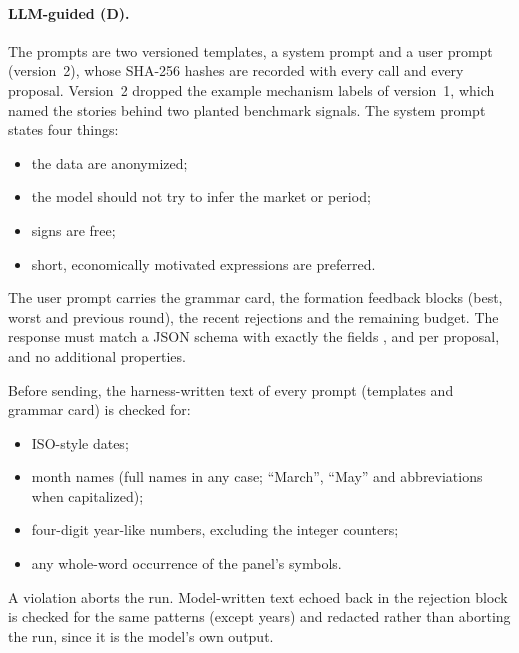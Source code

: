 \paragraph{LLM-guided (D).} The prompts are two versioned templates, a system
prompt and a user prompt (version~2), whose SHA-256 hashes are recorded with
every call and every proposal. Version~2 dropped the example mechanism labels
of version~1, which named the stories behind two planted benchmark signals.
The system prompt states four things:
\begin{itemize}
  \item the data are anonymized;
  \item the model should not try to infer the market or period;
  \item signs are free;
  \item short, economically motivated expressions are preferred.
\end{itemize}
The user prompt carries the grammar card, the formation feedback blocks
(best, worst and previous round), the recent rejections and the remaining
budget. The response must match a JSON schema with exactly the fields
,  and  per
proposal, and no additional properties.

Before sending, the harness-written text of every prompt (templates and
grammar card) is checked for:
\begin{itemize}
  \item ISO-style dates;
  \item month names (full names in any case; ``March'', ``May'' and
    abbreviations when capitalized);
  \item four-digit year-like numbers, excluding the integer counters;
  \item any whole-word occurrence of the panel's symbols.
\end{itemize}
A violation aborts the run. Model-written text echoed back in the rejection
block is checked for the same patterns (except years) and redacted rather
than aborting the run, since it is the model's own output.

